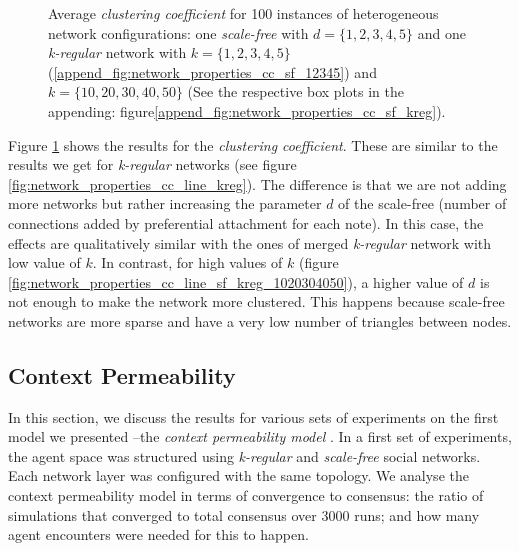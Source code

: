 \documentclass[preprint,number]{elsarticle}
\begin{document}
\begin{figure}[H]
          \begin{minipage}{0.9\textwidth}
            \vspace{0.2cm}
            \caption{Average \textit{clustering coefficient} for 100 instances of heterogeneous
              network configurations: one \textit{scale-free} with $d=\{1,2,3,4,5\}$ and one
              \textit{k-regular} network with $k=\{1,2,3,4,5\}$
              (\ref{append_fig:network_properties_cc_sf_12345}) and $k=\{10,20,30,40,50\} $ (See the
              respective box plots in the appending:
              figure\ref{append_fig:network_properties_cc_sf_kreg}).}
		\label{fig:network_properties_line_cc_sf_kreg}
              \end{minipage}
        \end{figure}

        \noindent Figure \ref{fig:network_properties_line_cc_sf_kreg} shows the results for the
        \textit{clustering coefficient}. These are similar to the results we get for
        \textit{k-regular} networks (see figure \ref{fig:network_properties_cc_line_kreg}). The
        difference is that we are not adding more networks but rather increasing the parameter $d$
        of the scale-free (number of connections added by preferential attachment for each
        note). In this case, the effects are qualitatively similar with the ones of merged
        \textit{k-regular} network with low value of $k$. In contrast, for high values of $k$
        (figure \ref{fig:network_properties_cc_line_sf_kreg_1020304050}), a higher value of $d$ is
        not enough to make the network more clustered. This happens because scale-free networks are
        more sparse and have a very low number of triangles between nodes.

        \subsection{Context Permeability}
\label{sec:results:context_permeability}

\noindent In this section, we discuss the results for various sets of experiments on the first model we presented --the \textit{context permeability model} \cite{Antunes2007,Antunes2010}. In a first set of experiments, the agent space was structured using \textit{k-regular} and \textit{scale-free }social networks. Each network layer was configured with the same topology. We analyse the context permeability model in terms of convergence to consensus: the ratio of simulations that converged to total consensus over 3000 runs; and how many agent encounters were needed for this to happen. 
\end{document}
